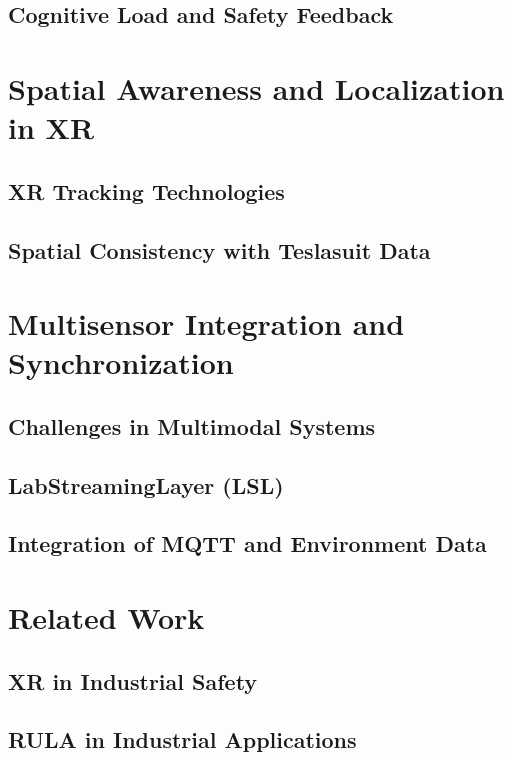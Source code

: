 \subsection{Cognitive Load and Safety Feedback}

\section{Spatial Awareness and Localization in XR}
\subsection{XR Tracking Technologies}

\subsection{Spatial Consistency with Teslasuit Data}

\section{Multisensor Integration and Synchronization}
\subsection{Challenges in Multimodal Systems}

\subsection{LabStreamingLayer (LSL)}

\subsection{Integration of MQTT and Environment Data}

\section{Related Work}
\subsection{XR in Industrial Safety}
\subsection{RULA in Industrial Applications}
